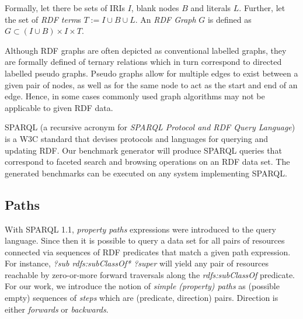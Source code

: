 Formally, let there be sets of IRIs $I$, blank nodes $B$ and literals $L$. Further, let the set of
\emph{RDF term}s $T := I \cup B \cup L$.
An \emph{RDF Graph} $G$ is defined as $G \subset (I \cup B) \times I \times T$.

Although RDF graphs are often depicted as conventional labelled graphs, they are formally defined of ternary relations which in turn correspond to directed labelled pseudo graphs. Pseudo graphs allow for multiple edges
to exist between a given pair of nodes, as well as for the same node to act as the start and end of an edge.
Hence, in some cases commonly used graph algorithms may not be applicable to given RDF data.

SPARQL (a recursive acronym for \emph{SPARQL Protocol and RDF Query Language})
is a W3C standard that devises protocols and languages for querying and updating RDF.
Our benchmark generator will produce SPARQL queries that correspond to faceted search and browsing operations on an RDF data set. The generated benchmarks can be executed on any system implementing SPARQL.


\subsection{Paths}
With SPARQL 1.1, \emph{property paths} expressions were introduced to the query language.
Since then it is possible to query a data set for all pairs of resources connected via sequences of RDF predicates that match a given path expression. For instance, \emph{?sub rdfs:subClassOf* ?super}
will yield any pair of resources reachable by zero-or-more forward traversals along the \emph{rdfs:subClassOf} predicate.
For our work, we introduce the notion of \emph{simple (property) paths} as (possible empty) sequences of \emph{steps} which are (predicate, direction) pairs. Direction is either \emph{forwards} or \emph{backwards}.



